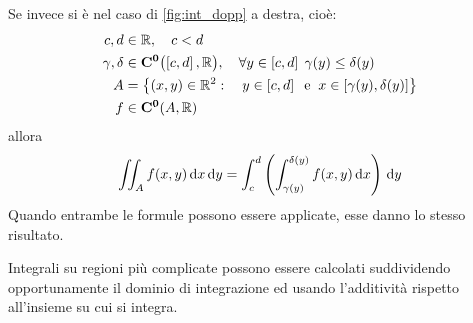 \vspace*{\baselineskip}
\noindent Se invece si è nel caso di \autoref{fig:int_dopp} a destra, cioè:
\begin{align*}
	c, d &\in \mathbb{R}, \quad c < d\\
	\gamma, \delta &\in \mathbf{C^{0}}\bigl( \left[c,d\right], \mathbb{R} \bigr), \quad \forall y \in \left[c,d\right]\; \gamma(y) \leq \delta(y)\\
	A &= \left\{(x,y) \in \mathbb{R}^2: \quad y \in \left[c,d\right] \;\; \text{e} \;\; x \in \left[\gamma(y),\delta(y)\right]\right\}\\
	f &\in \mathbf{C^{0}}(A, \mathbb{R})\\
\end{align*}
allora
\[\iint_A f(x,y) \,\mathrm{d}{x} \,\mathrm{d}{y} = \int_c^d \left( \int_{\gamma(y)}^{\delta(y)} f(x,y) \,\mathrm{d}{x} \right) \,\mathrm{d}{y}\]
Quando entrambe le formule possono essere applicate, esse danno lo stesso risultato.
\begin{note}
	Integrali su regioni più complicate possono essere calcolati suddividendo opportunamente il dominio di integrazione ed usando l'additività rispetto all'insieme su cui si integra.	
\end{note}

\newpage
